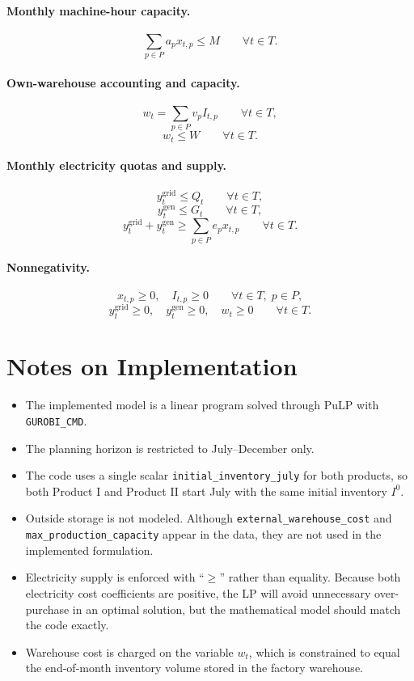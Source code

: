 \paragraph{Monthly machine-hour capacity.}
\[
\sum_{p\in P} a_p x_{t,p} \le M
\qquad \forall t\in T.
\]

\paragraph{Own-warehouse accounting and capacity.}
\[
w_t = \sum_{p\in P} v_p I_{t,p}
\qquad \forall t\in T,
\]
\[
w_t \le W
\qquad \forall t\in T.
\]

\paragraph{Monthly electricity quotas and supply.}
\[
y_t^{\text{grid}} \le Q_t
\qquad \forall t\in T,
\]
\[
y_t^{\text{gen}} \le G_t
\qquad \forall t\in T,
\]
\[
y_t^{\text{grid}} + y_t^{\text{gen}}
\ge
\sum_{p\in P} e_p x_{t,p}
\qquad \forall t\in T.
\]

\paragraph{Nonnegativity.}
\[
x_{t,p}\ge 0,\quad I_{t,p}\ge 0
\qquad \forall t\in T,\; p\in P,
\]
\[
y_t^{\text{grid}}\ge 0,\quad y_t^{\text{gen}}\ge 0,\quad w_t\ge 0
\qquad \forall t\in T.
\]

\section*{Notes on Implementation}

\begin{itemize}
    \item The implemented model is a linear program solved through PuLP with \texttt{GUROBI\_CMD}.
    \item The planning horizon is restricted to July--December only.
    \item The code uses a single scalar \texttt{initial\_inventory\_july} for both products, so both Product I and Product II start July with the same initial inventory \(I^0\).
    \item Outside storage is not modeled. Although \texttt{external\_warehouse\_cost} and \texttt{max\_production\_capacity} appear in the data, they are not used in the implemented formulation.
    \item Electricity supply is enforced with ``\(\ge\)'' rather than equality. Because both electricity cost coefficients are positive, the LP will avoid unnecessary over-purchase in an optimal solution, but the mathematical model should match the code exactly.
    \item Warehouse cost is charged on the variable \(w_t\), which is constrained to equal the end-of-month inventory volume stored in the factory warehouse.
\end{itemize}
